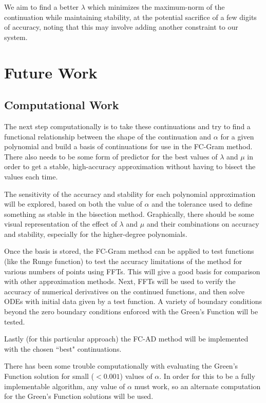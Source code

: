 \documentclass[11pt]{amsart}
\begin{document}
We aim to find a better $\lambda$ which minimizes the maximum-norm of the continuation while maintaining stability, at the potential sacrifice of a few digits of accuracy, noting that this may involve adding another constraint to our system.


\section{Future Work} 
\subsection{Computational Work} 
The next step computationally is to take these continuations and try to find a functional relationship between the shape of the continuation and $\alpha$ for a given polynomial and build a basis of continuations for use in the FC-Gram method.  There also needs to be some form of predictor for the best values of $\lambda$ and $\mu$ in order to get a stable, high-accuracy approximation without having to bisect the values each time.

The sensitivity of the accuracy and stability for each polynomial approximation will be explored, based on both the value of $\alpha$ and the tolerance used to define something as stable in the bisection method.  Graphically, there should be some visual representation of the effect of $\lambda$ and $\mu$ and their combinations on accuracy and stability, especially for the higher-degree polynomials.  

Once the basis is stored, the FC-Gram method can be applied to test functions (like the Runge function) to test the accuracy limitations of the method for various numbers of points using FFTs.  This will give a good basis for comparison with other approximation methods.  Next, FFTs will be used to verify the accuracy of numerical derivatives on the continued functions, and then solve ODEs with initial data given by a test function.  A variety of boundary conditions beyond the zero boundary conditions enforced with the Green's Function will be tested.  

Lastly (for this particular approach) the FC-AD method will be implemented with the chosen ``best" continuations.  

There has been some trouble computationally with evaluating the Green's Function solution for small ($<0.001$) values of $\alpha$.  In order for this to be a fully implementable algorithm, any value of $\alpha$ must work, so an alternate computation for the Green's Function solutions will be used.  
\end{document}
